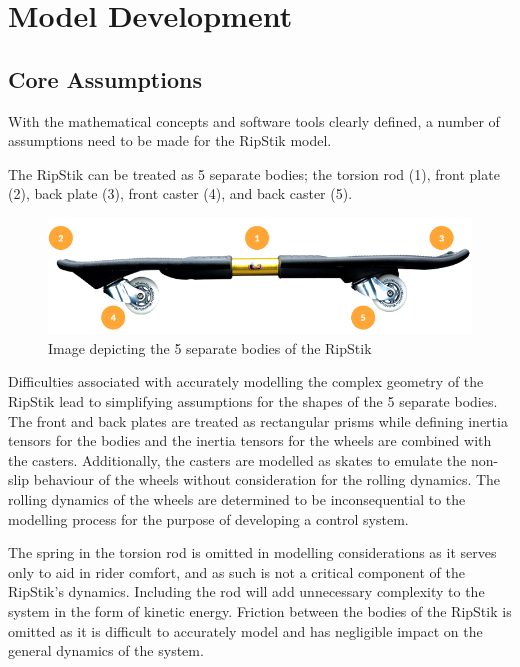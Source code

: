 \section{Model Development}
\subsection{Core Assumptions}

With the mathematical concepts and software tools clearly defined, a number of assumptions need to be made for the RipStik model.
\par
The RipStik can be treated as 5 separate bodies; the torsion rod (1), front plate (2), back plate (3), front caster (4), and back caster (5).

\begin{figure}[!htb]
	\centering
	\includegraphics[width=\linewidth]{RipStikModel.png}
	\caption{Image depicting the 5 separate bodies of the RipStik}\label{fig:RipStikModel}
	\endminipage
\end{figure}  

Difficulties associated with accurately modelling the complex geometry of the RipStik lead to simplifying assumptions for the shapes of the 5 separate bodies.
The front and back plates are treated as rectangular prisms while defining inertia tensors for the bodies and the inertia tensors for the wheels are combined with the casters. 
Additionally, the casters are modelled as skates to emulate the non-slip behaviour of the wheels without consideration for the rolling dynamics. 
The rolling dynamics of the wheels are determined to be inconsequential to the modelling process for the purpose of developing a control system.
\par
The spring in the torsion rod is omitted in modelling considerations as it serves only to aid in rider comfort, and as such is not a critical component of the RipStik's dynamics. 
Including the rod will add unnecessary complexity to the system in the form of kinetic energy.
Friction between the bodies of the RipStik is omitted as it is difficult to accurately model and has negligible impact on the general dynamics of the system.


